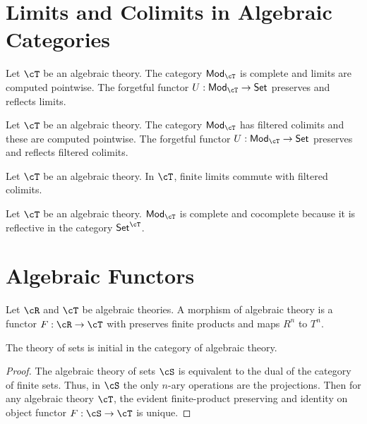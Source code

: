 \documentclass{amsart}
\begin{document}
\section{Limits and Colimits in Algebraic Categories}
\label{sec:limits-and-colimits-in-algebraic-categories}

\begin{lem}
  Let $\cT$ be an algebraic theory.
  The category $\mathsf{Mod}_{\cT}$ is complete and limits are computed pointwise.
  The forgetful functor $U : \mathsf{Mod}_{\cT} \to \mathsf{Set}$ preserves and reflects limits.
\end{lem}

\begin{lem}
  Let $\cT$ be an algebraic theory.
  The category $\mathsf{Mod}_{\cT}$ has filtered colimits and these are computed pointwise.
  The forgetful functor $U : \mathsf{Mod}_{\cT} \to \mathsf{Set}$ preserves and reflects filtered colimits.
\end{lem}

\begin{lem}
  Let $\cT$ be an algebraic theory.
  In $\mathsf{\cT}$, finite limits commute with filtered colimits.
\end{lem}

\begin{lem}
  Let $\cT$ be an algebraic theory.
  $\mathsf{Mod}_{\cT}$ is complete and cocomplete because it is reflective in the category $\mathsf{Set}^{\cT}$.
\end{lem}

\section{Algebraic Functors}
\label{sec:algebraic-functors}

\begin{defn}
  Let $\cR$ and $\cT$ be algebraic theories.
  A morphism of algebraic theory is a functor $F : \cR \to \cT$ with preserves finite products and maps $R^{n}$ to $T^{n}$.
\end{defn}

\begin{lem}
  The theory of sets is initial in the category of algebraic theory.
\end{lem}
\begin{proof}
  The algebraic theory of sets $\cS$ is equivalent to the dual of the category of finite sets.
  Thus, in $\cS$ the only $n$-ary operations are the projections.
  Then for any algebraic theory $\cT$, the evident finite-product preserving and identity on object functor $F : \cS \to \cT$ is unique.
\end{proof}
\end{document}
